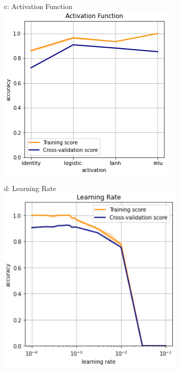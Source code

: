 \documentclass{article}
\begin{document}
\begin{figure}
\begin{subfigure}{.24\textwidth}
	\end{subfigure}
	\begin{subfigure}{.24\textwidth}
		\centering
		c: Activation Function\\
		\includegraphics[width=\linewidth]{mnist_nn_activation.png}
		
	\end{subfigure}
	\begin{subfigure}{.24\textwidth}
		\centering
		d: Learning Rate\\
		\includegraphics[width=\linewidth]{mnist_nn_learning_rate.png}
		

\end{subfigure}
\end{figure}
\end{document}
